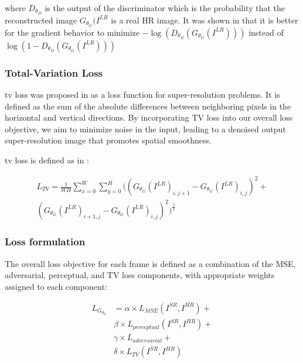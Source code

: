 \documentclass[conference]{IEEEtran}
\begin{document}
where $D_{\theta_D}$ is the output of the discriminator which is the probability that the reconstructed image $G_{\theta_G} (I^{LR}$ is a real HR image. It was shown in \cite{goodfellow2014generative} that it is better for the gradient behavior to minimize $-\log ( D_{\theta_D}( G_{\theta_G} (I^{LR}) ) )$ instead of $\log (1 - D_{\theta_D}( G_{\theta_G} (I^{LR}) ) )$

\subsubsection{Total-Variation Loss\label{sec:total_variation_loss}}

\acrshort{tv} loss was proposed in \cite{image_upsampling_total_variation_regularization_2005} as a loss function for super-resolution problems. It is defined as the sum of the absolute differences between neighboring pixels in the horizontal and vertical directions. By incorporating TV loss into our overall loss objective, we aim to minimize noise in the input, leading to a denoised output super-resolution image that promotes spatial smoothness.

\acrshort{tv} loss is defined as in \cite{deep_learning_image_sr_2020}:

\begin{gather*} \label{eq:tv_loss}
	L_{TV} = \frac{1}{WH} \sum_{x=0}^{W} \sum_{y=0}^{H}  ((G_{\theta_G} (I^{LR})_{i, j+1} - G_{\theta_G} (I^{LR})_{i, j})^2 + \\(G_{\theta_G} (I^{LR})_{i+1, j} - G_{\theta_G} (I^{LR})_{i, j})^2 )^{\frac{1}{2}}
\end{gather*}

\subsubsection{Loss formulation}

The overall loss objective for each frame is defined as a combination of the MSE, adversarial, perceptual, and TV loss components, with appropriate weights assigned to each component:

\begin{equation} \label{eq:total_Gloss}
	\begin{split}
		L_{G_{\theta_G}} &= \alpha \times L_{MSE}(I^{SR}, I^{HR}) + \\
		& \beta \times L_{perceptual} (I^{SR}, I^{HR}) + \\
		& \gamma \times L_{adversarial}  + \\
		& \delta \times L_{TV} (I^{SR}, I^{HR})
	\end{split}
\end{equation}
\end{document}
